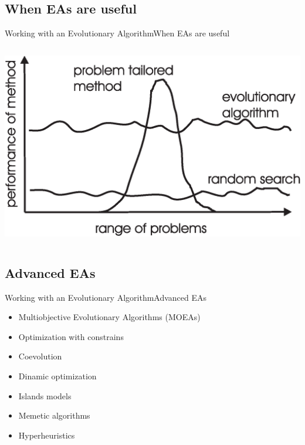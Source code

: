\documentclass[10pt,compress]{beamer} %
\begin{document}
\subsection{When  EAs are useful}
\begin{frame}{Working with an Evolutionary Algorithm}{When EAs are useful}
    \begin{columns}
		\includegraphics[width=\linewidth]{figs/problems.eps}
	\end{columns}
\end{frame}

\subsection{Advanced EAs}
\begin{frame}{Working with an Evolutionary Algorithm}{Advanced EAs}
	\begin{itemize}
	\item Multiobjective Evolutionary Algorithms (MOEAs)
	\item Optimization with constrains
	\item Coevolution
	\item Dinamic optimization
	\item Islands models
	\item Memetic algorithms
	\item Hyperheuristics
	\end{itemize}
\end{frame}
\end{document}
